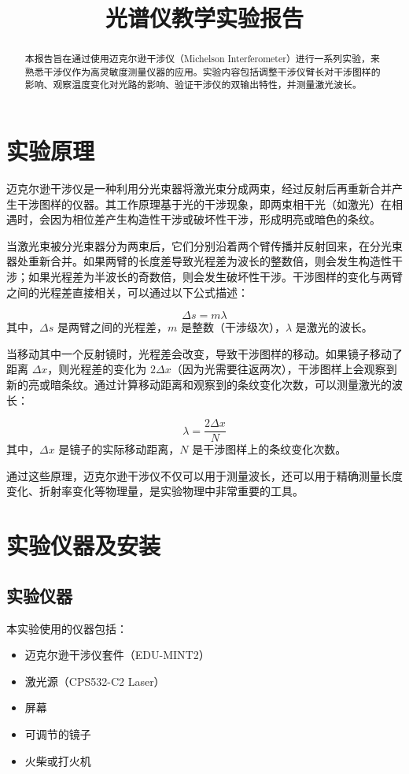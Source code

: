 \documentclass{ctexart}
\title{光谱仪教学实验报告}
\begin{document}
\maketitle

\begin{abstract}
本报告旨在通过使用迈克尔逊干涉仪（Michelson Interferometer）进行一系列实验，来熟悉干涉仪作为高灵敏度测量仪器的应用。实验内容包括调整干涉仪臂长对干涉图样的影响、观察温度变化对光路的影响、验证干涉仪的双输出特性，并测量激光波长。
\end{abstract}

\section{实验原理}
迈克尔逊干涉仪是一种利用分光束器将激光束分成两束，经过反射后再重新合并产生干涉图样的仪器。其工作原理基于光的干涉现象，即两束相干光（如激光）在相遇时，会因为相位差产生构造性干涉或破坏性干涉，形成明亮或暗色的条纹。

当激光束被分光束器分为两束后，它们分别沿着两个臂传播并反射回来，在分光束器处重新合并。如果两臂的长度差导致光程差为波长的整数倍，则会发生构造性干涉；如果光程差为半波长的奇数倍，则会发生破坏性干涉。干涉图样的变化与两臂之间的光程差直接相关，可以通过以下公式描述：

\[ \Delta s = m \lambda \]
其中，\(\Delta s\) 是两臂之间的光程差，\(m\) 是整数（干涉级次），\(\lambda\) 是激光的波长。

当移动其中一个反射镜时，光程差会改变，导致干涉图样的移动。如果镜子移动了距离 \(\Delta x\)，则光程差的变化为 \(2\Delta x\)（因为光需要往返两次），干涉图样上会观察到新的亮或暗条纹。通过计算移动距离和观察到的条纹变化次数，可以测量激光的波长：

\[ \lambda = \frac{2 \Delta x}{N} \]
其中，\(\Delta x\) 是镜子的实际移动距离，\(N\) 是干涉图样上的条纹变化次数。


通过这些原理，迈克尔逊干涉仪不仅可以用于测量波长，还可以用于精确测量长度变化、折射率变化等物理量，是实验物理中非常重要的工具。
\section{实验仪器及安装}
\subsection{实验仪器}
本实验使用的仪器包括：
\begin{itemize}
    \item 迈克尔逊干涉仪套件（EDU-MINT2）
    \item 激光源（CPS532-C2 Laser）
    \item 屏幕
    \item 可调节的镜子
    \item 火柴或打火机
\end{itemize}
\end{document}
